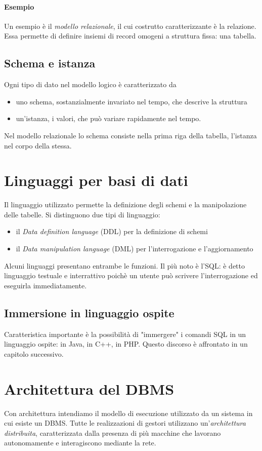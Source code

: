 \paragraph{Esempio} Un esempio è il \emph{modello relazionale}, il cui costrutto caratterizzante è la relazione. Essa permette di definire insiemi di record omogeni a struttura fissa: una tabella.
\subsection{Schema e istanza}
Ogni tipo di dato nel modello logico è caratterizzato da
\begin{itemize}
	\item uno schema, sostanzialmente invariato nel tempo, che descrive la struttura
	\item un'istanza, i valori, che può variare rapidamente nel tempo.
\end{itemize}
Nel modello relazionale lo schema consiste nella prima riga della tabella, l'istanza nel corpo della stessa.
\section{Linguaggi per basi di dati}
Il linguaggio utilizzato permette la definizione degli schemi e la manipolazione delle tabelle. Si distinguono due tipi di linguaggio:
\begin{itemize}
	\item il \emph{Data definition language} (DDL) per la definizione di schemi
	\item il \emph{Data manipulation language} (DML) per l'interrogazione e l'aggiornamento
\end{itemize}
Alcuni linguaggi presentano entrambe le funzioni. Il più noto è l'SQL: è detto linguaggio testuale e interrattivo poichè un utente può scrivere l'interrogazione ed eseguirla immediatamente.
\subsection{Immersione in linguaggio ospite}
Caratteristica importante è la possibilità di "immergere" i comandi SQL in un linguaggio ospite: in Java, in C++, in PHP. Questo discorso è affrontato in un capitolo successivo.

\section{Architettura del DBMS}
Con architettura intendiamo il modello di esecuzione utilizzato da un sistema in cui esiste un DBMS. Tutte le realizzazioni di gestori utilizzano un'\emph{architettura distribuita}, caratterizzata dalla presenza di più macchine che lavorano autonomamente e interagiscono mediante la rete.
